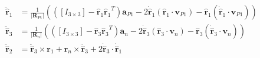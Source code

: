 \documentclass[]{AVSSimReportMemo}
\begin{document}
\begin{subequations}
	\begin{align}
		\ddot{\hat{\bm{r}}}_1 &= \frac{1}{|{\bm R}_{P1}|}
		(
		([I_{3\times3}] - {\hat{\bm{r}}_1}{\hat{\bm{r}}_1}^T)  \bm{a}_{P1} - 
		2\dot{\hat{\bm{r}}}_1 (\hat{\bm{r}}_1 \cdot \bm{v}_{P1}) - 
		\hat{\bm{r}}_1 (\dot{\hat{\bm{r}}}_1 \cdot \bm{v}_{P1}) 
		) \\
		\ddot{\hat{\bm{r}}}_3 &= \frac{1}{|{\bm R}_{n}|}
		(
		([I_{3\times3}] - {\hat{\bm{r}}_3}{\hat{\bm{r}}_3}^T)  \bm{a}_{n} - 
		2\dot{\hat{\bm{r}}}_3 (\hat{\bm{r}}_3 \cdot \bm{v}_{n}) - 
		\hat{\bm{r}}_3 (\dot{\hat{\bm{r}}}_3 \cdot \bm{v}_{n}) 
		) \\
		\ddot{\hat{\bm{r}}}_2 &= \ddot{\hat{\bm{r}}}_3 \times \bm{r}_1 +  \bm{r}_n  \times \ddot{\hat{\bm{r}}}_3 + 2\dot{\hat{\bm{r}}}_3 \cdot \dot{\hat{\bm{r}}}_1
	\end{align}
\end{subequations}
\end{document}
